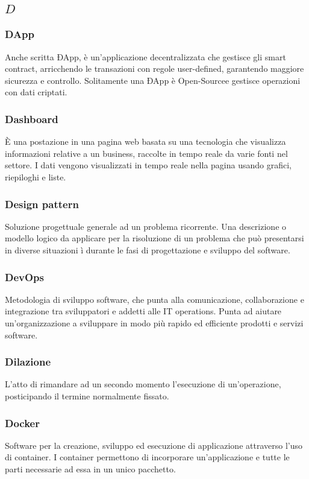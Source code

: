 \subsection*{\quad$D\quad$}
\subsubsection*{DApp}
Anche scritta ÐApp, è un'applicazione decentralizzata che gestisce gli smart contract\glo, arricchendo le transazioni con regole user-defined, garantendo maggiore sicurezza e controllo. Solitamente una ÐApp è Open-Source\glosp e gestisce operazioni con dati criptati.

\subsubsection*{Dashboard}
È una postazione in una pagina web basata su una tecnologia che visualizza informazioni relative a un business, raccolte in tempo reale da varie fonti nel settore. I dati vengono visualizzati in tempo reale nella pagina usando grafici, riepiloghi e liste.

\subsubsection*{Design pattern}
Soluzione progettuale generale ad un problema ricorrente. Una descrizione o modello logico da applicare per la risoluzione di un problema che può presentarsi in diverse situazioni ì durante le fasi di progettazione e sviluppo del software.

\subsubsection*{DevOps}
Metodologia di sviluppo software, che punta alla comunicazione, collaborazione e integrazione tra sviluppatori e addetti alle IT operations. Punta ad aiutare un'organizzazione a sviluppare in modo più rapido ed efficiente prodotti e servizi software.

\subsubsection*{Dilazione}
L'atto di rimandare ad un secondo momento l'esecuzione di un'operazione, posticipando il termine normalmente fissato.

\subsubsection*{Docker}
Software per la creazione, sviluppo ed esecuzione di applicazione attraverso l’uso di container. I container
permettono di incorporare un’applicazione e tutte le parti necessarie ad essa in un unico pacchetto.

